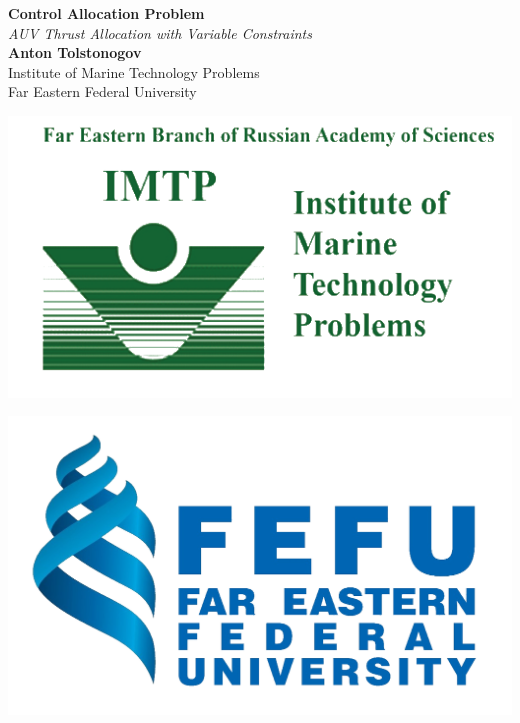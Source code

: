 \documentclass[a0,portrait]{a0poster}
\begin{document}
\begin{minipage}[t]{0.50\linewidth}
\vspace{-8cm}
\begin{flushleft}
\veryHuge \color{NavyBlue} \textbf{Control Allocation Problem} \color{Black}\\ %
\Huge\textit{AUV Thrust Allocation with Variable Constraints}\\ [1cm] %
\huge \textbf{Anton Tolstonogov}\\ %
\huge Institute of Marine Technology Problems\\ %
\huge Far Eastern Federal University\\
\end{flushleft}
\end{minipage}
\hfill
\begin{minipage}[t]{0.20\linewidth}
\centering
\includegraphics[width=\linewidth]{fig/logo_imtp.png}
\end{minipage}
\hfill
\begin{minipage}[t]{0.20\linewidth}
\centering
\includegraphics[width=\linewidth]{fig/logo_fefu.png}
\end{minipage}
\end{document}
